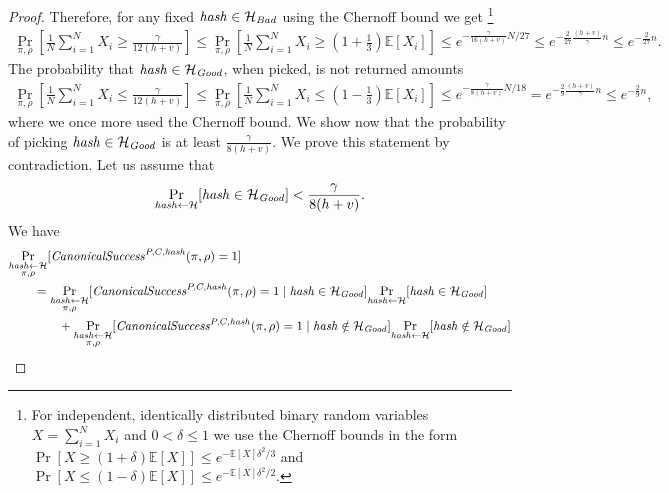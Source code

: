 \begin{proof}
Therefore, for any fixed $\operatorname{\mathit{hash}} \in \mathcal{H}_{\mathit{Bad}}$ using the Chernoff bound we get \footnote{For independent, identically distributed binary
random variables $X = \sum_{i=1}^N X_i$ and $0 < \delta \leq 1$ we use the Chernoff bounds in the form
$\Pr[X \geq (1+\delta) \mathbb{E}[X]] \leq e^{- \mathbb{E}[X] \delta^2/3}$ and
$\Pr[X \leq (1-\delta) \mathbb{E}[X]] \leq e^{- \mathbb{E}[X] \delta^2/2}$.}
\begin{align*}
  \underset{\pi,\rho}{\Pr} \left[\frac{1}{N} \sum_{i=1}^{N} X_i \geq \frac{\gamma}{12(h+v)} \right] \leq
  \underset{\pi, \rho}{\Pr}\left[\frac{1}{N} \sum_{i=1}^{N} X_i \geq (1 + \frac{1}{3}) \mathbb{E}[X_i]\right] \leq
  e^{-{\frac{\gamma}{16(h+v)}} N / 27} \leq e^{-\frac{2}{27}\frac{(h+v)}{\gamma}n} \leq e^{-\frac{2}{27}n}.
\end{align*}
%
The probability that $\operatorname{\mathit{hash}} \in \mathcal{H}_{\mathit{Good}}$, when picked, is not returned amounts
\begin{align*}
  \underset{\pi, \rho}{\Pr}\left[\frac{1}{N} \sum_{i=1}^{N} X_i \leq \frac{\gamma}{12(h+v)}\right] \leq
  \underset{\pi, \rho}{\Pr}\left[\frac{1}{N} \sum_{i=1}^{N} X_i \leq (1 - \frac{1}{3})\mathbb{E}[X_i]\right]
  \leq e^{-{\frac{\gamma}{8(h+v)}} N / 18} = e^{-\frac{2}{9} \frac{(h+v)}{\gamma}n} \leq e^{-\frac{2}{9}n},
\end{align*}
where we once more used the Chernoff bound.
We show now that the probability of picking $\operatorname{\mathit{hash}} \in \mathcal{H}_{\mathit{Good}}$ is at least $\frac{\gamma}{8(h+v)}$.
We prove this statement by contradiction. Let us assume that
\begin{align}
  \label{ass:hash_max_prob}
\underset{\operatorname{\mathit{hash}} \leftarrow \mathcal{H}}{\Pr}[\operatorname{\mathit{hash}} \in \mathcal{H}_{\mathit{Good}}] < \frac{\gamma}{8(h+v)}.
\end{align}
We have
\begin{align*}
  &\underset{\substack{\hash \leftarrow \cH \\ \pi, \rho}}{\Pr}[\CanonicalSuccess^{P,C,\hash}(\pi, \rho) = 1] \\
  &\IndI = \underset{\substack{ \hash \leftarrow \cH \\ \pi, \rho}}{\Pr}[\CanonicalSuccess^{P,C,\hash}(\pi, \rho) = 1 \mid \hash \in \cH_{\mathit{Good}}]
  \underset{\hash \leftarrow \cH}{\Pr}[\hash \in \cH_{\mathit{Good}}] \\
  & \IndII + \underset{\substack{\hash \leftarrow \cH \\ \pi, \rho}}{\Pr}[\CanonicalSuccess^{P,C,\hash}(\pi, \rho) = 1 \mid \hash \notin \cH_{\mathit{Good}}]
  \underset{\hash \leftarrow \cH}{\Pr}[\hash \notin \cH_{\mathit{Good}}] \\

\end{align*}
\end{proof}
